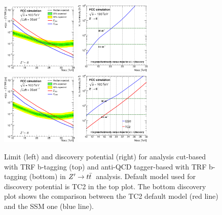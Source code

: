 \documentclass{cernrep}
\newcommand*{\zptt}{\ensuremath{Z^{\prime} \rightarrow \ttbar}}
\begin{document}
\begin{figure}[!htb]\centering
\includegraphics[width=0.33\textwidth]{Fig/Zptt/lim_Zprime_tt_fcc_v02_cut_TRFbtag.eps}
\includegraphics[width=0.33\textwidth]{Fig/Zptt/DiscoveryPotential_tt_cut_TRFbtag_rootStyle.eps}
\includegraphics[width=0.33\textwidth]{Fig/Zptt/lim_Zprime_tt_fcc_v02_tagger_TRFbtag.eps}
\includegraphics[width=0.33\textwidth]{Fig/Zptt/DiscoveryPotential_tt_SSM_TC2_tagger_TRFbtag_rootStyle.eps}
\caption{Limit (left) and discovery potential (right) for analysis cut-based with TRF b-tagging (top) and anti-QCD tagger-based with TRF b-tagging (bottom) in \zptt\ analysis. Default model used for discovery potential is TC2 in the top plot. The bottom discovery plot shows the comparison between the TC2 default model (red line) and the SSM one (blue line).}
\label{fig:Zptt_limit_trf}
\end{figure}
\end{document}

